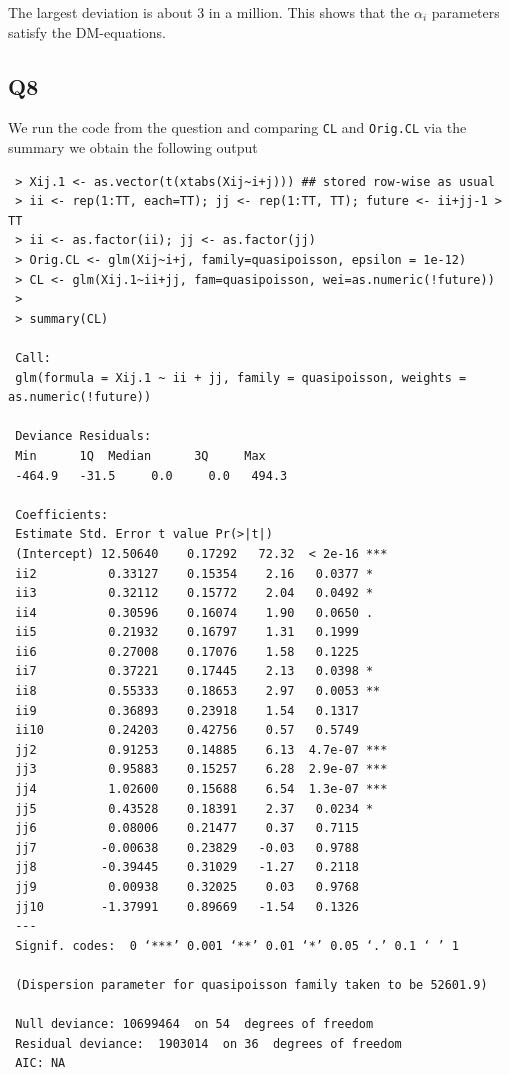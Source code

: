 \documentclass[11pt]{article}
\begin{document}
The largest deviation is about 3 in a million. This shows that the $\alpha_i$ parameters satisfy the DM-equations.

\subsection*{Q8}
We run the code from the question and comparing \verb|CL| and \verb|Orig.CL| via the summary we obtain the following output 

\begin{verbatim}
 > Xij.1 <- as.vector(t(xtabs(Xij~i+j))) ## stored row-wise as usual
 > ii <- rep(1:TT, each=TT); jj <- rep(1:TT, TT); future <- ii+jj-1 > TT
 > ii <- as.factor(ii); jj <- as.factor(jj)
 > Orig.CL <- glm(Xij~i+j, family=quasipoisson, epsilon = 1e-12)
 > CL <- glm(Xij.1~ii+jj, fam=quasipoisson, wei=as.numeric(!future))
 > 
 > summary(CL)
 
 Call:
 glm(formula = Xij.1 ~ ii + jj, family = quasipoisson, weights = as.numeric(!future))
 
 Deviance Residuals: 
 Min      1Q  Median      3Q     Max  
 -464.9   -31.5     0.0     0.0   494.3  
 
 Coefficients:
 Estimate Std. Error t value Pr(>|t|)    
 (Intercept) 12.50640    0.17292   72.32  < 2e-16 ***
 ii2          0.33127    0.15354    2.16   0.0377 *  
 ii3          0.32112    0.15772    2.04   0.0492 *  
 ii4          0.30596    0.16074    1.90   0.0650 .  
 ii5          0.21932    0.16797    1.31   0.1999    
 ii6          0.27008    0.17076    1.58   0.1225    
 ii7          0.37221    0.17445    2.13   0.0398 *  
 ii8          0.55333    0.18653    2.97   0.0053 ** 
 ii9          0.36893    0.23918    1.54   0.1317    
 ii10         0.24203    0.42756    0.57   0.5749    
 jj2          0.91253    0.14885    6.13  4.7e-07 ***
 jj3          0.95883    0.15257    6.28  2.9e-07 ***
 jj4          1.02600    0.15688    6.54  1.3e-07 ***
 jj5          0.43528    0.18391    2.37   0.0234 *  
 jj6          0.08006    0.21477    0.37   0.7115    
 jj7         -0.00638    0.23829   -0.03   0.9788    
 jj8         -0.39445    0.31029   -1.27   0.2118    
 jj9          0.00938    0.32025    0.03   0.9768    
 jj10        -1.37991    0.89669   -1.54   0.1326    
 ---
 Signif. codes:  0 ‘***’ 0.001 ‘**’ 0.01 ‘*’ 0.05 ‘.’ 0.1 ‘ ’ 1
 
 (Dispersion parameter for quasipoisson family taken to be 52601.9)
 
 Null deviance: 10699464  on 54  degrees of freedom
 Residual deviance:  1903014  on 36  degrees of freedom
 AIC: NA
 

\end{verbatim}
\end{document}
